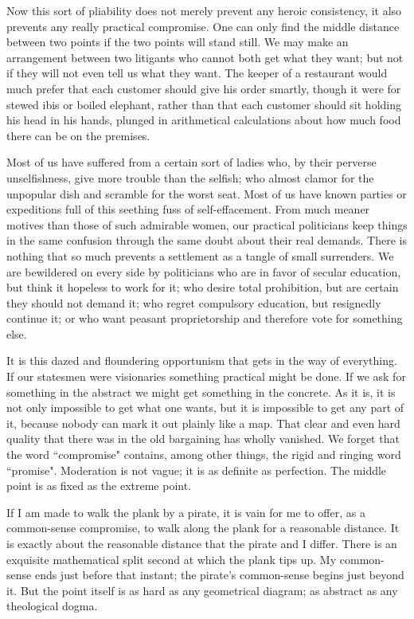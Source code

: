 \documentclass[final,10pt,letterpaper,twocolumn,openany]{book}
\begin{document}
Now this sort of pliability does not merely prevent any heroic
consistency, it also prevents any really practical compromise. One can
only find the middle distance between two points if the two points will
stand still. We may make an arrangement between two litigants who
cannot both get what they want; but not if they will not even tell us what
they want. The keeper of a restaurant would much prefer that each
customer should give his order smartly, though it were for stewed ibis or
boiled elephant, rather than that each customer should sit holding his head
in his hands, plunged in arithmetical calculations about how much food
there can be on the premises. 

Most of us have suffered from a certain sort
of ladies who, by their perverse unselfishness, give more trouble than the
selfish; who almost clamor for the unpopular dish and scramble for the
worst seat. Most of us have known parties or expeditions full of this
seething fuss of self-effacement. From much meaner motives than those of
such admirable women, our practical politicians keep things in the same
confusion through the same doubt about their real demands. There is
nothing that so much prevents a settlement as a tangle of small surrenders.
We are bewildered on every side by politicians who are in favor of secular
education, but think it hopeless to work for it; who desire total prohibition,
but are certain they should not demand it; who regret compulsory
education, but resignedly continue it; or who want peasant proprietorship
and therefore vote for something else. 

It is this dazed and floundering
opportunism that gets in the way of everything. If our statesmen were
visionaries something practical might be done. If we ask for something in
the abstract we might get something in the concrete. As it is, it is not only
impossible to get what one wants, but it is impossible to get any part of it,
because nobody can mark it out plainly like a map. That clear and even
hard quality that there was in the old bargaining has wholly vanished. We
forget that the word ``compromise" contains, among other things, the rigid
and ringing word ``promise". Moderation is not vague; it is as definite as
perfection. The middle point is as fixed as the extreme point.

If I am made to walk the plank by a pirate, it is vain for me to offer, as
a common-sense compromise, to walk along the plank for a reasonable
distance. It is exactly about the reasonable distance that the pirate and I
differ. There is an exquisite mathematical split second at which the plank
tips up. My common-sense ends just before that instant; the pirate's
common-sense begins just beyond it. But the point itself is as hard as any
geometrical diagram; as abstract as any theological dogma.
\end{document}
